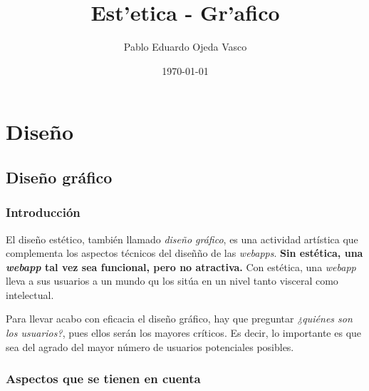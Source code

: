 \documentclass[a4paper,oneside,11pt]{book}
\begin{document}
\title{Est'etica - Gr'afico}
\author{Pablo Eduardo Ojeda Vasco}
\date{\today}



	\maketitle
%
%
\chapter{Diseño} %
	\label{sec:diseno}

	\section{Diseño gráfico} %
	\label{sec:grafico}
	
	\subsection{Introducción} %
		\label{sub:graf_introduccion}
	
		El diseño estético, también llamado \textit{diseño gráfico}, es una actividad artística que complementa los aspectos técnicos del diseñño de las \textit{webapps}. \textbf{Sin estética, una \textit{webapp} tal vez sea funcional, pero no atractiva.} Con estética, una \textit{webapp} lleva a sus usuarios a un mundo qu los sitúa en un nivel tanto visceral como intelectual.
		
		Para llevar acabo con eficacia el diseño gráfico, hay que preguntar \textit{¿quiénes son los usuarios?}, pues ellos serán los mayores críticos. Es decir, lo importante es que sea del agrado del mayor número de usuarios potenciales posibles.
		
		
	\subsection{Aspectos que se tienen en cuenta} %
	\label{sub:graf_aspectos_que_se_tienen_en_cuenta}
	
\end{document}
